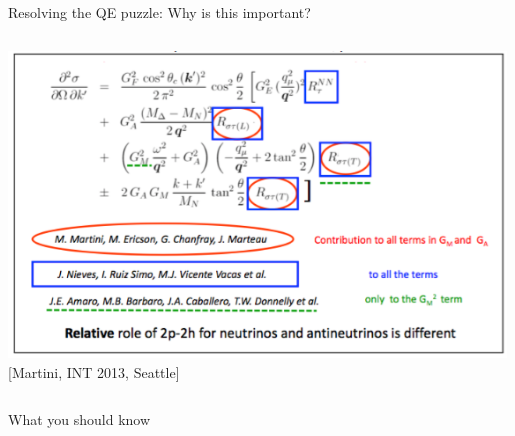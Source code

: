 \begin{frame}{Resolving the QE puzzle: Why is this important?}
\begin{columns}[T]
\begin{column}{0.50\textwidth}
{     \begin{center}
        \includegraphics[width=0.99\textwidth]{./images/nuint/ccqe/martini_3models_nunubar.png}\\
        {\tiny [Martini, INT 2013, Seattle]}
     \end{center}
    }
    \end{column}
  \end{columns}

\end{frame}


%
%





%
%

\begin{frame}{What you should know}

\end{frame}


%
%

